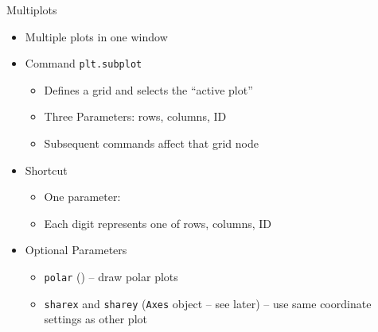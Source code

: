 
\begin{frame}[fragile]{Multiplots}
%
\begin{itemize}
\item Multiple plots in one window
\item Command \texttt{plt.subplot}
	\begin{itemize}
	\item Defines a grid and selects the \enquote{active plot}
	\item Three Parameters: rows, columns, ID
	\item Subsequent commands affect that grid node
	\end{itemize}
\item Shortcut
	\begin{itemize}
	\item One parameter: 
	\item Each digit represents one of rows, columns, ID
	\end{itemize}
\item Optional Parameters
	\begin{itemize}
	\item \texttt{polar} () -- draw polar plots
	\item \texttt{sharex} and \texttt{sharey} (\texttt{Axes} object -- see later) -- use same coordinate settings as other plot
	\end{itemize}
\end{itemize}
%
\end{frame}


